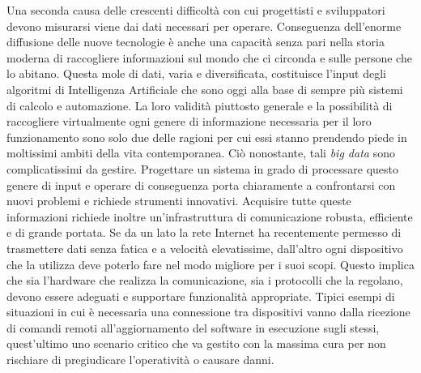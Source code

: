 Una seconda causa delle crescenti difficoltà con cui progettisti e sviluppatori devono misurarsi viene dai dati necessari per operare. Conseguenza dell'enorme diffusione delle nuove tecnologie è anche una capacità senza pari nella storia moderna di raccogliere informazioni sul mondo che ci circonda e sulle persone che lo abitano. Questa mole di dati, varia e diversificata, costituisce l'input degli algoritmi di Intelligenza Artificiale che sono oggi alla base di sempre più sistemi di calcolo e automazione. La loro validità piuttosto generale e la possibilità di raccogliere virtualmente ogni genere di informazione necessaria per il loro funzionamento sono solo due delle ragioni per cui essi stanno prendendo piede in moltissimi ambiti della vita contemporanea. Ciò nonostante, tali \emph{big data} sono complicatissimi da gestire. Progettare un sistema in grado di processare questo genere di input e operare di conseguenza porta chiaramente a confrontarsi con nuovi problemi e richiede strumenti innovativi. Acquisire tutte queste informazioni richiede inoltre un'infrastruttura di comunicazione robusta, efficiente e di grande portata. Se da un lato la rete Internet ha recentemente permesso di trasmettere dati senza fatica e a velocità elevatissime, dall'altro ogni dispositivo che la utilizza deve poterlo fare nel modo migliore per i suoi scopi. Questo implica che sia l'hardware che realizza la comunicazione, sia i protocolli che la regolano, devono essere adeguati e supportare funzionalità appropriate. Tipici esempi di situazioni in cui è necessaria una connessione tra dispositivi vanno dalla ricezione di comandi remoti all'aggiornamento del software in esecuzione sugli stessi, quest'ultimo uno scenario critico che va gestito con la massima cura per non rischiare di pregiudicare l'operatività o causare danni.\\
